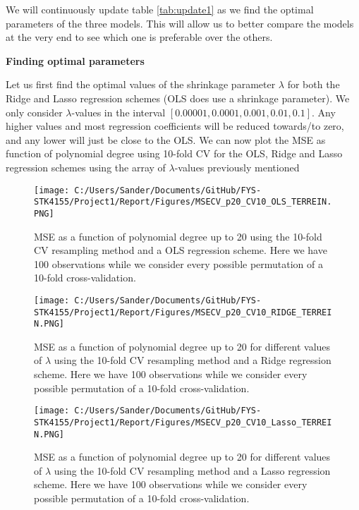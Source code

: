 \documentclass[12pt,a4paper]{article}
\begin{document}
\noindent We will continuously update table \ref{tab:update1} as we find the optimal parameters of the three models. This will allow us to better compare the models at the very end to see which one is preferable over the others. 

\begin{center}
\large{\textbf{Finding optimal parameters}}
\end{center}

\noindent Let us first find the optimal values of the shrinkage parameter $\lambda$ for both the Ridge and Lasso regression schemes (OLS does use a shrinkage parameter). We only consider $\lambda$-values in the interval $[0.00001,0.0001,0.001,0.01,0.1]$. Any higher values and most regression coefficients will be reduced towards/to zero, and any lower will just be close to the OLS. We can now plot the MSE as function of polynomial degree using 10-fold CV for the OLS, Ridge and Lasso regression schemes using the array of $\lambda$-values previously mentioned

\begin{figure}[H]
\centering
\texttt{[image: C:/Users/Sander/Documents/GitHub/FYS-STK4155/Project1/Report/Figures/MSECV\_p20\_CV10\_OLS\_TERREIN.PNG]}
\caption{\label{fig:MSEOLST} MSE as a function of polynomial degree up to 20 using the 10-fold CV resampling method and a OLS regression scheme. Here we have 100 observations while we consider every possible permutation of a 10-fold cross-validation.}
\end{figure}

\begin{figure}[H]
\centering
\texttt{[image: C:/Users/Sander/Documents/GitHub/FYS-STK4155/Project1/Report/Figures/MSECV\_p20\_CV10\_RIDGE\_TERREIN.PNG]}
\caption{\label{fig:MSERIDGET} MSE as a function of polynomial degree up to 20 for different values of $\lambda$ using the 10-fold CV resampling method and a Ridge regression scheme. Here we have 100 observations while we consider every possible permutation of a 10-fold cross-validation.}
\end{figure}

\begin{figure}[H]
\centering
\texttt{[image: C:/Users/Sander/Documents/GitHub/FYS-STK4155/Project1/Report/Figures/MSECV\_p20\_CV10\_Lasso\_TERREIN.PNG]}
\caption{\label{fig:MSELASSOT} MSE as a function of polynomial degree up to 20 for different values of $\lambda$ using the 10-fold CV resampling method and a Lasso regression scheme. Here we have 100 observations while we consider every possible permutation of a 10-fold cross-validation.}
\end{figure}
\end{document}
